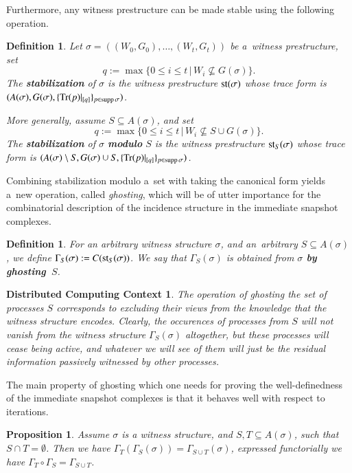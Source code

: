 \documentclass{amsart}[10pt]
\newtheorem{df}[theorem]{Definition}
\newtheorem{prop}[theorem]{Proposition}
\newtheorem{dcc}[theorem]{Distributed Computing Context}
\newcommand{\st}{\text{\rm{st}}}
\newcommand{\supp}{\text{\rm supp}\,}
\newcommand{\trc}{{\text{\rm Tr}}}
\newcommand{\ab}{\allowbreak}
\numberwithin{equation}{section}
\numberwithin{figure}{section}
\numberwithin{table}{section}
\begin{document}
Furthermore, any witness prestructure can be made stable using the
following operation.

\begin{df} \label{df:st}
Let $\sigma=((W_0,G_0),\dots,(W_t,G_t))$ be a~witness prestructure,
set
\[q:=\max\{0\leq i\leq t\,|\,W_i\not\subseteq G(\sigma)\}.\]
The {\bf stabilization} of $\sigma$ is the witness prestructure
$\st(\sigma)$ whose trace form is $(A(\sigma),\ab G(\sigma), \ab
\{\trc(p)|_{[q]}\}_{p\in\supp\sigma})$.

More generally, assume $S\subseteq A(\sigma)$, and set
\[q:=\max\{0\leq i\leq t\,|\,W_i\not\subseteq S\cup G(\sigma)\}.\]
The {\bf stabilization} of $\sigma$ {\bf modulo} $S$ is the witness
prestructure $\st_S(\sigma)$ whose trace form is $(A(\sigma)\setminus
S,\ab G(\sigma)\cup S, \{\trc(p)|_{[q]}\}_{p\in\supp\sigma})$.
\end{df}

Combining stabilization modulo a~set with taking the canonical form
yields a~new operation, called {\it ghosting}, which will be of utter
importance for the combinatorial description of the incidence
structure in the immediate snapshot complexes.

\begin{df}\label{df:go}
For an arbitrary witness structure $\sigma$, and an~arbitrary
$S\subseteq A(\sigma)$, we define
$\Gamma_S(\sigma):=C(\st_S(\sigma))$. We say that $\Gamma_S(\sigma)$
is obtained from $\sigma$ {\bf by ghosting~$S$}.
\end{df}

\begin{dcc}\label{dcc:4}
The operation of ghosting the set of processes $S$ corresponds to
excluding their views from the knowledge that the witness structure
encodes. Clearly, the occurences of processes from $S$ will not vanish
from the witness structure $\Gamma_S(\sigma)$ altogether, but these
processes will cease being active, and whatever we will see of them
will just be the residual information passively witnessed by other
processes.
\end{dcc}

The main property of ghosting which one needs for proving the
well-definedness of the immediate snapshot complexes is that it
behaves well with respect to iterations.

\begin{prop} 
\label{prop:gg}
Assume $\sigma$ is a witness structure, and $S,T\subseteq A(\sigma)$, 
such that $S\cap T=\emptyset$. Then we have
$\Gamma_T(\Gamma_S(\sigma))=\Gamma_{S\cup T}(\sigma)$, expressed 
functorially we have $\Gamma_T\circ\Gamma_S=\Gamma_{S\cup T}$.
\end{prop}
\end{document}
